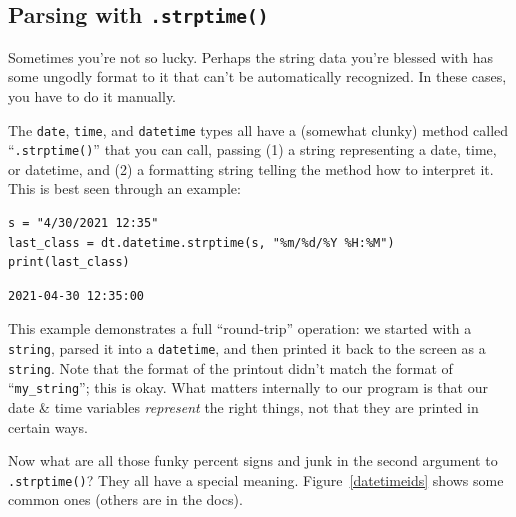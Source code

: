 \subsection{Parsing with \texttt{.strptime()}}

Sometimes you're not so lucky. Perhaps the string data you're blessed with has
some ungodly format to it that can't be automatically recognized. In these
cases, you have to do it manually.


The \texttt{date}, \texttt{time}, and \texttt{datetime} types all have a
(somewhat clunky) method called ``\texttt{.strptime()}'' that you can call,
passing (1) a string representing a date, time, or datetime, and (2) a
formatting string telling the method how to interpret it. This is best seen
through an example:

\begin{Verbatim}[fontsize=\footnotesize,samepage=true,frame=single,framesep=3mm]
s = "4/30/2021 12:35"
last_class = dt.datetime.strptime(s, "%m/%d/%Y %H:%M")
print(last_class)
\end{Verbatim}
\vspace{-.2in}

\begin{Verbatim}[fontsize=\small,samepage=true,frame=leftline,framesep=5mm,framerule=1mm]
2021-04-30 12:35:00
\end{Verbatim}

This example demonstrates a full ``round-trip'' operation: we started with a
\texttt{string}, parsed it into a \texttt{datetime}, and then printed it back
to the screen as a \texttt{string}. Note that the format of the printout
didn't match the format of ``\texttt{my\_string}''; this is okay. What matters
internally to our program is that our date \& time variables \textit{represent}
the right things, not that they are printed in certain ways.

Now what are all those funky percent signs and junk in the second argument to
\texttt{.strptime()}? They all have a special meaning. Figure~\ref{datetimeids}
shows some common ones (others are in the docs).

